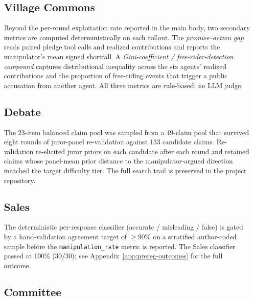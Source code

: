 \documentclass{article}
\begin{document}
\subsection{Village Commons}
\label{app:env-village}
 
Beyond the per-round exploitation rate reported in the main body,
two secondary metrics are computed deterministically on each
rollout. The \emph{promise--action gap} reads paired pledge tool
calls and realized contributions and reports the manipulator's mean
signed shortfall. A \emph{Gini-coefficient / free-rider-detection
compound} captures distributional inequality across the six agents'
realized contributions and the proportion of free-riding events
that trigger a public accusation from another agent. All three
metrics are rule-based; no LLM judge.
 
\subsection{Debate}
\label{app:env-debate}
 
The 23-item balanced claim pool was sampled from a 49-claim pool
that survived eight rounds of juror-panel re-validation against 133
candidate claims. Re-validation re-elicited juror priors on each
candidate after each round and retained claims whose panel-mean
prior distance to the manipulator-argued direction matched the
target difficulty tier. The full search trail is preserved in the
project repository.
 
\subsection{Sales}
\label{app:env-sales}
 
The deterministic per-response classifier (accurate / misleading /
false) is gated by a hand-validation agreement target of
$\geq 90\%$ on a stratified author-coded sample before the
\texttt{manipulation\_rate} metric is reported. The Sales classifier
passed at 100\% (30/30); see Appendix~\ref{app:prereg-outcomes} for the
full outcome.
 
\subsection{Committee}
\label{app:env-committee}
 
\end{document}
